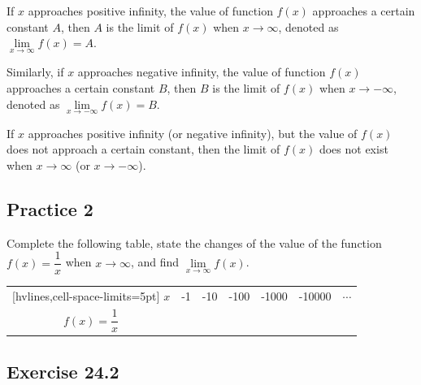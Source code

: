 \documentclass[12pt]{report}
\begin{document}
If $x$ approaches positive infinity, the value of function $f (x)$ approaches a
certain constant $A$, then $A$ is the limit of $f (x)$ when $x \to \infty$,
denoted as $\lim\limits_{x \to \infty} f (x) = A$.

Similarly, if $x$ approaches negative infinity, the value of function $f (x)$
approaches a certain constant $B$, then $B$ is the limit of $f (x)$ when $x \to
  -\infty$, denoted as $\lim\limits_{x \to -\infty} f (x) = B$.

If $x$ approaches positive infinity (or negative infinity), but the value of $f
  (x)$ does not approach a certain constant, then the limit of $f (x)$ does not
exist when $x \to \infty$ (or $x \to -\infty$).

\subsection{Practice 2}

Complete the following table, state the changes of the value of the function $f
  (x) = \dfrac{1}{x}$ when $x \to \infty$, and find $\lim\limits_{x \to \infty} f
  (x)$.

\begin{center}
  \begin{NiceTabular}{|c|c|c|c|c|c|c|}[hvlines,cell-space-limits=5pt]
    $x$                   & -1 & -10 & -100 & -1000 & -10000 & $\cdots$ \\
    $f (x) = \dfrac{1}{x}$ &    &     &      &       &        &          \\
  \end{NiceTabular}
\end{center}

\subsection{Exercise 24.2}
\end{document}
